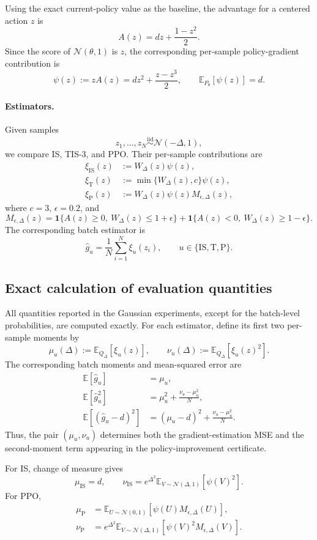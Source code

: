 \documentclass[11pt]{article}
\theoremstyle{remark}
\newcommand{\E}{\mathbb{E}}
\begin{document}
Using the exact current-policy value as the baseline, the advantage for a centered action $z$ is
\[
A(z)=dz+\frac{1-z^2}{2}.
\]
Since the score of $\mathcal N(\theta,1)$ is $z$, the corresponding per-sample policy-gradient contribution is
\[
\psi(z):=zA(z)=dz^2+\frac{z-z^3}{2},
\qquad
\E_{P_\theta}[\psi(z)]=d.
\]

\paragraph{Estimators.}
Given samples
\[
z_1,\ldots,z_N\stackrel{\mathrm{iid}}{\sim}\mathcal N(-\Delta,1),
\]
we compare IS, TIS-3, and PPO. Their per-sample contributions are
\begin{align*}
\xi_{\mathrm{IS}}(z) &:= W_\Delta(z)\psi(z),\\
\xi_{\mathrm{T}}(z) &:= \min\{W_\Delta(z),c\}\psi(z),\\
\xi_{\mathrm{P}}(z) &:= W_\Delta(z)\psi(z)M_{\epsilon,\Delta}(z),
\end{align*}
where $c=3$, $\epsilon=0.2$, and
\[
M_{\epsilon,\Delta}(z)
=
\mathbf 1\{A(z)\ge0,\ W_\Delta(z)\le1+\epsilon\}
+
\mathbf 1\{A(z)<0,\ W_\Delta(z)\ge1-\epsilon\}.
\]
The corresponding batch estimator is
\[
\widehat g_u
=
\frac1N\sum_{i=1}^N\xi_u(z_i),
\qquad
u\in\{\mathrm{IS},\mathrm{T},\mathrm{P}\}.
\]

\subsection{Exact calculation of evaluation quantities}

All quantities reported in the Gaussian experiments, except for the batch-level probabilities, are computed exactly. For each estimator, define its first two per-sample moments by
\[
\mu_u(\Delta):=\E_{Q_\Delta}[\xi_u(z)],
\qquad
\nu_u(\Delta):=\E_{Q_\Delta}[\xi_u(z)^2].
\]
The corresponding batch moments and mean-squared error are
\begin{align*}
\E[\widehat g_u] &= \mu_u,\\
\E[\widehat g_u^2] &= \mu_u^2+\frac{\nu_u-\mu_u^2}{N},\\
\E[(\widehat g_u-d)^2] &= (\mu_u-d)^2+\frac{\nu_u-\mu_u^2}{N}.
\end{align*}
Thus, the pair $(\mu_u,\nu_u)$ determines both the gradient-estimation MSE and the second-moment term appearing in the policy-improvement certificate.

For IS, change of measure gives
\[
\mu_{\mathrm{IS}}=d,
\qquad
\nu_{\mathrm{IS}}
=
e^{\Delta^2}
\E_{V\sim\mathcal N(\Delta,1)}[\psi(V)^2].
\]
For PPO,
\begin{align*}
\mu_{\mathrm{P}}
&=
\E_{U\sim\mathcal N(0,1)}[\psi(U)M_{\epsilon,\Delta}(U)],\\
\nu_{\mathrm{P}}
&=
e^{\Delta^2}
\E_{V\sim\mathcal N(\Delta,1)}[\psi(V)^2M_{\epsilon,\Delta}(V)].
\end{align*}
\end{document}
